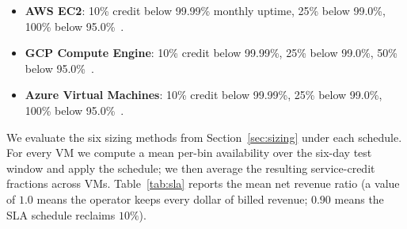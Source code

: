 \documentclass[11pt,a4paper]{article}
\begin{document}
\begin{itemize}
  \item \textbf{AWS EC2}: 10\% credit below 99.99\% monthly uptime, 25\%
        below 99.0\%, 100\% below 95.0\%~\cite{awsec2sla}.
  \item \textbf{GCP Compute Engine}: 10\% credit below 99.99\%, 25\% below
        99.0\%, 50\% below 95.0\%~\cite{gcpcesla}.
  \item \textbf{Azure Virtual Machines}: 10\% credit below 99.99\%, 25\%
        below 99.0\%, 100\% below 95.0\%~\cite{azurevmsla}.
\end{itemize}

We evaluate the six sizing methods from Section~\ref{sec:sizing} under
each schedule. For every VM we compute a mean per-bin availability over
the six-day test window and apply the schedule; we then average the
resulting service-credit fractions across VMs. Table~\ref{tab:sla} reports
the mean net revenue ratio (a value of $1.0$ means the operator keeps every
dollar of billed revenue; $0.90$ means the SLA schedule reclaims $10\%$).
\end{document}

